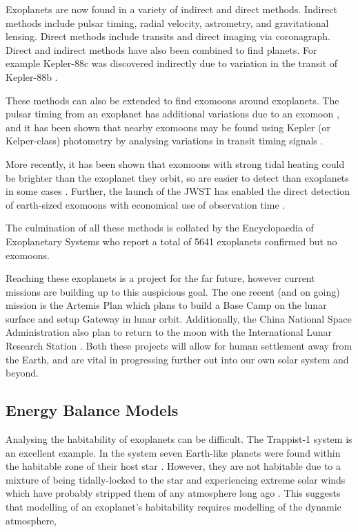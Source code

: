 \documentclass[12pt, onecolumn]{revtex4-2}    %
\begin{document}
Exoplanets are now found in a variety of indirect and direct methods.
Indirect methods include pulsar timing, radial velocity, astrometry, and gravitational lensing.
Direct methods include transits and direct imaging via coronagraph.
Direct and indirect methods have also been combined to find planets. 
For example Kepler-88c was discovered indirectly due to variation in the transit of Kepler-88b \cite{Nesvorny2013}.

These methods can also be extended to find exomoons around exoplanets.
The pulsar timing from an exoplanet has additional variations due to an exomoon \cite{Lewis2008}, and it has been shown that nearby exomoons may be found using Kepler (or Kelper-class) photometry by analysing variations in transit timing signals \cite{KSG2009}.

More recently, it has been shown that exomoons with strong tidal heating could be brighter than the exoplanet they orbit, so are easier to detect than exoplanets in some cases \cite{LimTurn2013}.
Further, the launch of the JWST has enabled the direct detection of earth-sized exomoons with economical use of observation time \cite{Limbach2021}.

The culmination of all these methods is collated by the Encyclopaedia of Exoplanetary Systems \cite{ExoEu} who report a total of 5641 exoplanets confirmed but no exomoons.

Reaching these exoplanets is a project for the far future, however current missions are building up to this auspicious goal.
The one recent (and on going) mission is the Artemis Plan \cite{NASA_Artemis} which plans to build a Base Camp on the lunar surface and setup Gateway in lunar orbit.
Additionally, the China National Space Administration also plan to return to the moon with the International Lunar Research Station \cite{CNSA_ILRS}.
Both these projects will allow for human settlement away from the Earth, and are vital in progressing further out into our own solar system and beyond.

\subsection{Energy Balance Models} \label{ssec:EBM_intro}
Analysing the habitability of exoplanets can be difficult.
The Trappist-1 system is an excellent example. In the system seven Earth-like planets were found within the habitable zone of their host star \cite{GTD2017}.
However, they are not habitable due to a mixture of being tidally-locked to the star and experiencing extreme solar winds which have probably stripped them of any atmosphere long ago \cite{Cohen2024, VanLooveren2024}.
This suggests that modelling of an exoplanet's habitability requires modelling of the dynamic atmosphere,
\end{document}
